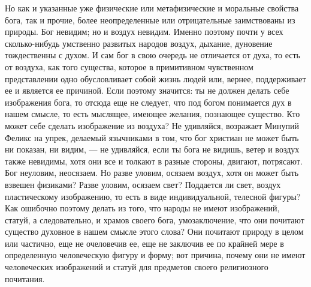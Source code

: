 \documentclass[12pt]{article}
\begin{document}
Но как и указанные уже физические или метафизические и моральные свойства бога, так и прочие, более неопределенные или отрицательные заимствованы из природы. Бог невидим; но и воздух невидим. Именно поэтому почти у всех сколько-нибудь умственно развитых народов воздух, дыхание, дуновение тождественны с духом. И сам бог в свою очередь не отличается от духа, то есть от воздуха, как того существа, которое в примитивном чувственном представлении одно обусловливает собой жизнь людей или, вернее, поддерживает ее и является ее причиной. Если поэтому значится: ты не должен делать себе изображения бога, то отсюда еще не следует, что под богом понимается дух в нашем смысле, то есть мыслящее, имеющее желания, познающее существо. Кто может себе сделать изображение из воздуха? Не удивляйся, возражает Минупий Феликс на упрек, делаемый язычниками в том, что бог христиан не может быть ни показан, ни видим, --- не удивляйся, если ты бога не видишь, ветер и воздух также невидимы, хотя они все и толкают в разные стороны, двигают, потрясают. Бог неуловим, неосязаем. Но разве уловим, осязаем воздух, хотя он может быть взвешен физиками? Разве уловим, осязаем свет? Поддается ли свет, воздух пластическому изображению, то есть в виде индивидуальной, телесной фигуры? Как ошибочно поэтому делать из того, что народы не имеют изображений, статуй, а следовательно, и храмов своего бога, умозаключение, что они почитают существо духовное в нашем смысле этого слова? Они почитают природу в целом или частично, еще не очеловечив ее, еще не заключив ее по крайней мере в определенную человеческую фигуру и форму; вот причина, почему они не имеют человеческих изображений и статуй для предметов своего религиозного почитания. 
\end{document}
